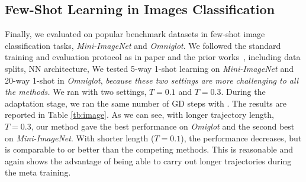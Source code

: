 
\vspace{-0.05in}
\subsection{Few-Shot Learning in Images Classification}
\vspace{-0.05in}
Finally, we evaluated \ours on popular benchmark datasets in few-shot image classification tasks,  \textit{Mini-ImageNet} and \textit{Omniglot}. We followed the standard training and evaluation protocol as in \imaml paper and the prior works~\citep{santoro2016meta,vinyals2016matching,finn2017model}, including data splits, NN architecture, \etc We tested  5-way 1-shot learning on \textit{Mini-ImageNet} and 20-way 1-shot in \textit{Omniglot}, \textit{because these two settings are more challenging to all the methods.} We ran \ours with two settings, $T=0.1$ and $T=0.3$.  During the adaptation stage, we ran the same number of GD steps with \imaml. 
The results are reported in Table \ref{tb:image}. As we can see, with longer trajectory length, \ie $T=0.3$, our method gave the best performance on \textit{Omiglot} and the second best on \textit{Mini-ImageNet}. With shorter length ($T=0.1$), the performance decreases, but is comparable to or better than the competing methods. This is reasonable and again shows the advantage of being able to carry out longer trajectories during the meta training. 






